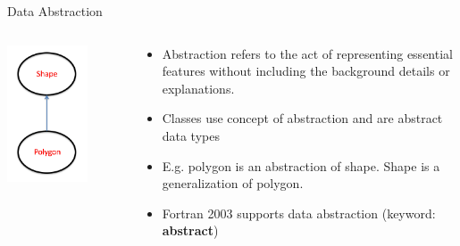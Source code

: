 \documentclass[11pt]{beamer}
\begin{document}

\begin{frame}{Data Abstraction}

\begin{columns}

 \begin{column}{0.38\textwidth}
        
\begin{center} 
  \includegraphics[width=0.7\textwidth]{../../shared/abstraction.png} 
\end{center} 

 \end{column}
  
  \begin{column}{0.7\textwidth}
    \begin{itemize}
        \item Abstraction refers to the act of representing essential features without including the background details or explanations.
        \item Classes use concept of abstraction and are abstract data types
	\item E.g. polygon is an abstraction of shape. Shape is a generalization of polygon.
	\item Fortran 2003 supports data abstraction (keyword: \textbf{abstract})
    \end{itemize}

  \end{column}
\end{columns}

\end{frame}
\end{document}
